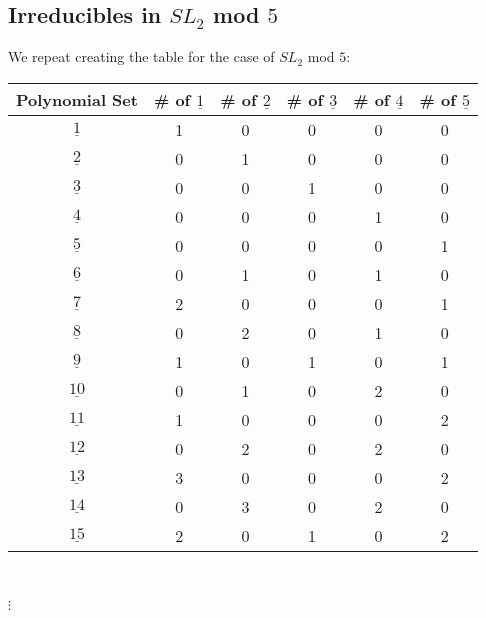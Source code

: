\documentclass[a4paper,draft]{amsproc}
\theoremstyle{plain}
\theoremstyle{definition}
\theoremstyle{remark}
\numberwithin{equation}{section}
\begin{document}
\subsection{Irreducibles in $SL_{2}$ mod $5$}
We repeat creating the table for the case of $SL_{2}$ mod $5$: 
\begin{table}[h]
\begin{tabular}{|c|c|c|c|c|c|}
\hline
Polynomial Set & \# of $\underline{1}$ & \# of $\underline{2}$ & \# of $\underline{3}$ & \# of $\underline{4}$ & \# of $\underline{5}$ \\ \hline

$\underline{1}$              & 1       & 0       & 0     & 0  & 0 \\ \hline
$\underline{2}$              & 0       & 1       & 0     & 0  & 0 \\ \hline
$\underline{3}$              & 0       & 0       & 1     & 0  & 0  \\ \hline
$\underline{4}$              & 0       & 0       & 0     & 1  & 0  \\ \hline
$\underline{5}$              & 0       & 0       & 0     & 0  & 1  \\ \hline
$\underline{6}$              & 0       & 1       & 0     & 1  & 0   \\ \hline
$\underline{7}$              & 2       & 0       & 0     & 0  & 1   \\ \hline
$\underline{8}$              & 0       & 2       & 0     & 1  & 0   \\ \hline
$\underline{9}$               & 1      & 0       & 1     & 0  & 1   \\ \hline
$\underline{10}$             & 0       & 1       & 0    & 2  & 0    \\ \hline
$\underline{11}$             & 1       & 0       & 0    & 0  & 2    \\ \hline
$\underline{12}$             & 0       & 2       & 0    & 2  & 0    \\ \hline
$\underline{13}$             & 3       & 0       & 0    & 0  & 2    \\ \hline
$\underline{14}$             & 0       & 3       & 0    & 2  & 0    \\ \hline
$\underline{15}$             & 2       & 0       & 1    & 0  & 2    \\ \hline
\end{tabular} \\
\begin{centering}$\vdots$\end{centering}
\end{table}
\end{document}
